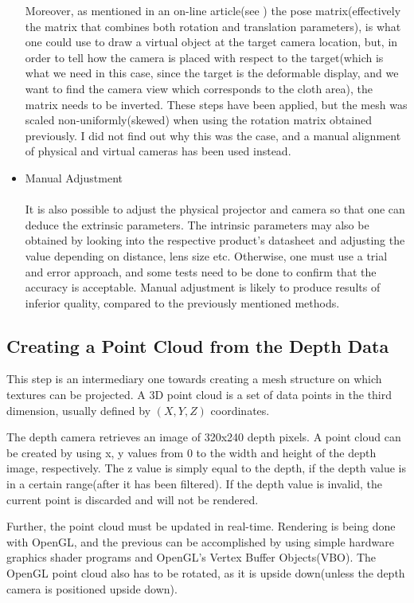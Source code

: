 \documentclass[]{article}
\begin{document}
\begin{itemize}
Moreover, as mentioned in an on-line article(see \cite{vuforia}) the pose matrix(effectively the matrix that combines both rotation and translation parameters), is what one could use to draw a virtual object at the target camera location, but, in order to tell how the camera is placed with respect to the target(which is what we need in this case, since the target is the deformable display, and we want to find the camera view which corresponds to the cloth area), the matrix needs to be inverted. These steps have been applied, but the mesh was scaled non-uniformly(skewed) when using the rotation matrix obtained previously. I did not find out why this was the case, and a manual alignment of physical and virtual cameras has been used instead.

\item Manual Adjustment\\
\\It is also possible to adjust the physical projector and camera so that one can deduce the extrinsic parameters. The intrinsic parameters may also be obtained by looking into the respective product's datasheet and adjusting the value depending on distance, lens size etc. Otherwise, one must use a trial and error approach, and some tests need to be done to confirm that the accuracy is acceptable. Manual adjustment is likely to produce results of inferior quality, compared to the previously mentioned methods.
\end{itemize}

\subsection{Creating a Point Cloud from the Depth Data}

This step is an intermediary one towards creating a mesh structure on which textures can be projected. A 3D point cloud is a set of data points in the third dimension, usually defined by $(X, Y, Z)$ coordinates.

The depth camera retrieves an image of 320x240 depth pixels. A point cloud can be created by using x, y values from 0 to the width and height of the depth image, respectively. The z value is simply equal to the depth, if the depth value is in a certain range(after it has been filtered). If the depth value is invalid, the current point is discarded and will not be rendered.

Further, the point cloud must be updated in real-time. Rendering is being done with OpenGL, and the previous can be accomplished by using simple hardware graphics shader programs and OpenGL's Vertex Buffer Objects(VBO). The OpenGL point cloud also has to be rotated, as it is upside down(unless the depth camera is positioned upside down).
\end{document}
